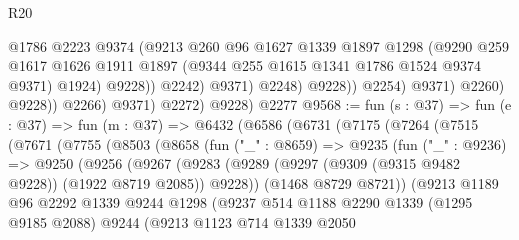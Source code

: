 \begin{lexlean}{R20}
\begin{coremodule}
                                  @1786
                                  @2223
                                  @9374
                                  (@9213
                                    @260
                                    @96
                                    @1627
                                    @1339
                                    @1897
                                    @1298
                                    (@9290
                                      @259
                                      @1617
                                      @1626
                                      @1911
                                      @1897
                                      (@9344 @255 @1615 @1341 @1786 @1524 @9374 @9371)
                                      @1924)
                                    @9228))
                                @2242)
                              @9371)
                            @2248)
                          @9228))
                      @2254)
                    @9371)
                  @2260)
                @9228))
            @2266)
          @9371)
        @2272)
      @9228)
    @2277
@9568 := fun (s : @37) =>
  fun (e : @37) =>
  fun (m : @37) =>
  @6432
    (@6586
      (@6731
        (@7175
          (@7264
            (@7515
              (@7671
                (@7755
                  (@8503
                    (@8658
                      (fun ("_" : @8659) =>
                      @9235
                        (fun ("_" : @9236) =>
                        @9250
                          (@9256
                            (@9267
                              (@9283
                                (@9289
                                  (@9297 (@9309 (@9315 @9482 @9228)) (@1922 @8719 @2085))
                                  @9228))
                              (@1468 @8729 @8721))
                            (@9213
                              @1189
                              @96
                              @2292
                              @1339
                              @9244
                              @1298
                              (@9237
                                @514
                                @1188
                                @2290
                                @1339
                                (@1295 @9185 @2088)
                                @9244
                                (@9213
                                  @1123
                                  @714
                                  @1339
                                  @2050

\end{coremodule}
\end{lexlean}
